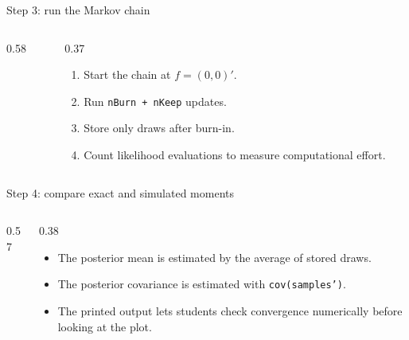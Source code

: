 \documentclass[aspectratio=169,11pt]{beamer}
\begin{document}
\begin{frame}[fragile]{Step 3: run the Markov chain}
  \begin{columns}[T,totalwidth=\textwidth]
    \begin{column}{0.58\textwidth}
      
    \end{column}
    \begin{column}{0.37\textwidth}
      \begin{enumerate}
        \setlength{\itemsep}{0.65em}
        \item Start the chain at \(f=(0,0)'\).
        \item Run \texttt{nBurn + nKeep} updates.
        \item Store only draws after burn-in.
        \item Count likelihood evaluations to measure computational effort.
      \end{enumerate}
    \end{column}
  \end{columns}
\end{frame}

\begin{frame}[fragile]{Step 4: compare exact and simulated moments}
  \begin{columns}[T,totalwidth=\textwidth]
    \begin{column}{0.57\textwidth}
      
    \end{column}
    \begin{column}{0.38\textwidth}
      \begin{itemize}
        \setlength{\itemsep}{0.75em}
        \item The posterior mean is estimated by the average of stored draws.
        \item The posterior covariance is estimated with \texttt{cov(samples')}.
        \item The printed output lets students check convergence numerically before looking at the plot.
      \end{itemize}
    \end{column}
  \end{columns}
\end{frame}
\end{document}
